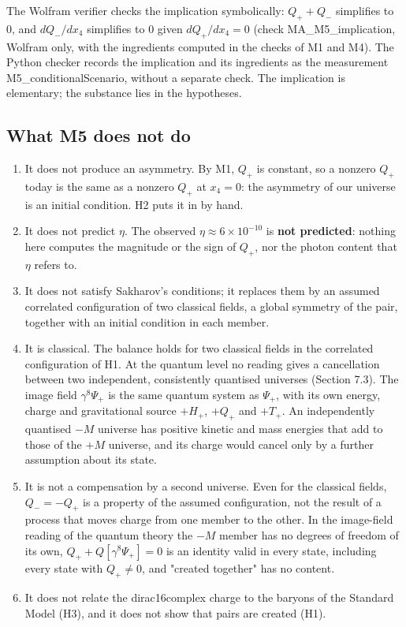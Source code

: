 \documentclass[11pt]{article}
\begin{document}
The Wolfram verifier checks the implication symbolically: $Q_++Q_-$ simplifies to 0, and $dQ_-/dx_4$ simplifies to 0 given $dQ_+/dx_4=0$ (check MA\_M5\_implication, Wolfram only, with the ingredients computed in the checks of M1 and M4). The Python checker records the implication and its ingredients as the measurement M5\_conditionalScenario, without a separate check. The implication is elementary; the substance lies in the hypotheses.

\subsection{What M5 does not do}

\begin{enumerate}
\item It does not produce an asymmetry. By M1, $Q_+$ is constant, so a nonzero $Q_+$ today is the same as a nonzero $Q_+$ at $x_4=0$: the asymmetry of our universe is an initial condition. H2 puts it in by hand.
\item It does not predict $\eta$. The observed $\eta\approx6\times10^{-10}$ is \textbf{not predicted}: nothing here computes the magnitude or the sign of $Q_+$, nor the photon content that $\eta$ refers to.
\item It does not satisfy Sakharov's conditions; it replaces them by an assumed correlated configuration of two classical fields, a global symmetry of the pair, together with an initial condition in each member.
\item It is classical. The balance holds for two classical fields in the correlated configuration of H1. At the quantum level no reading gives a cancellation between two independent, consistently quantised universes (Section 7.3). The image field $\gamma^8\Psi_+$ is the same quantum system as $\Psi_+$, with its own energy, charge and gravitational source $+H_+$, $+Q_+$ and $+T_+$. An independently quantised $-M$ universe has positive kinetic and mass energies that add to those of the $+M$ universe, and its charge would cancel only by a further assumption about its state.
\item It is not a compensation by a second universe. Even for the classical fields, $Q_-=-Q_+$ is a property of the assumed configuration, not the result of a process that moves charge from one member to the other. In the image-field reading of the quantum theory the $-M$ member has no degrees of freedom of its own, $Q_++Q[\gamma^8\Psi_+]=0$ is an identity valid in every state, including every state with $Q_+\ne0$, and "created together" has no content.
\item It does not relate the dirac16complex charge to the baryons of the Standard Model (H3), and it does not show that pairs are created (H1).
\end{enumerate}
\end{document}
